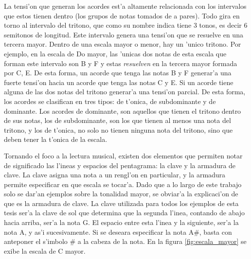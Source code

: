 La tensi'on que generan los acordes est'a altamente relacionada con los intervalos que estos tienen dentro (los grupos de notas tomados de a pares).
Todo gira en torno al intervalo del tritono, que como su nombre indica tiene 3 tonos, es decir 6 semitonos de longitud. Este intervalo genera una 
tensi'on que se resuelve en una tercera mayor. Dentro de una escala mayor o menor, hay un 'unico tritono. Por ejemplo, en la escala de Do mayor, 
las 'unicas dos notas de esta escala que forman este intervalo son B y F y estas \emph{resuelven} en la tercera mayor formada por
C, E. De esta forma, un acorde que tenga las notas B y F generar'a una fuerte tensi'on hacia un acorde que tenga las notas C y E. Si un acorde
tiene alguna de las dos notas del tritono generar'a una tensi'on parcial. De esta forma, los acordes se clasifican en tres tipos: de t'onica,
de subdominante y de dominante. Los acordes de dominante, son aquellos que tienen el tritono dentro de sus notas, los de subdominante, son los 
que tienen al menos una nota del tritono, y los de t'onica, no solo no tienen ninguna nota del tritono, sino que deben tener la t'onica
de la escala.


Tornando el foco a la lectura musical, existen dos elementos que permiten notar de significado las l'ineas y espacios del pentagrama: la clave
y la armadura de clave. La clave asigna una nota a un rengl'on en particular, y la armadura permite especificar en que escala se tocar'a. 
Dado que a lo largo de este trabajo solo se dar'an ejemplos sobre la tonalidad mayor, se obviar'a la explicaci'on de que es la armadura de clave. 
La clave utilizada para todos los ejemplos de esta tesis ser'a la clave de sol que determina que la segunda l'inea, contando de abajo hacia
arriba, ser'a la nota G. El espacio entre esta l'inea y la siguiente, ser'a la nota A, y as'i sucesivamente. Si se deseara especificar
la nota A\#, basta con anteponer el s'imbolo \# a la cabeza de la nota. En la figura \ref{fig:escala_mayor} se exibe la escala de C mayor.


\begin{imagen}
    \width{12cm}
\end{imagen}
